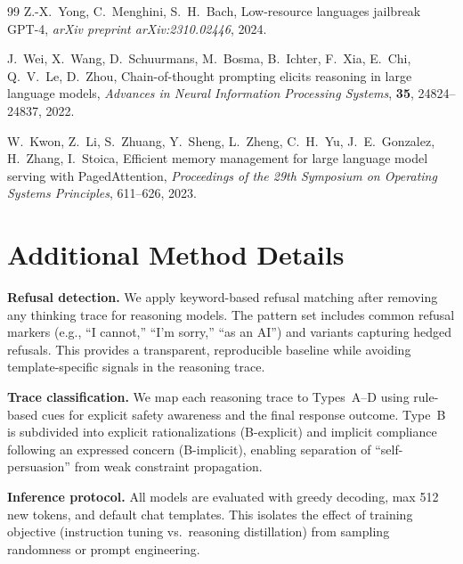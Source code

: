 \documentclass[AMS,STIX2COL]{WileyNJD-v2}
\begin{document}
\begin{thebibliography}{99}
Z.-X.~Yong, C.~Menghini, S.~H.~Bach,
Low-resource languages jailbreak GPT-4,
\textit{arXiv preprint arXiv:2310.02446}, 2024.

J.~Wei, X.~Wang, D.~Schuurmans, M.~Bosma, B.~Ichter, F.~Xia, E.~Chi,
Q.~V.~Le, D.~Zhou,
Chain-of-thought prompting elicits reasoning in large language models,
\textit{Advances in Neural Information Processing Systems},
\textbf{35}, 24824--24837, 2022.

W.~Kwon, Z.~Li, S.~Zhuang, Y.~Sheng, L.~Zheng, C.~H.~Yu,
J.~E.~Gonzalez, H.~Zhang, I.~Stoica,
Efficient memory management for large language model serving with
PagedAttention,
\textit{Proceedings of the 29th Symposium on Operating Systems Principles},
611--626, 2023.

\end{thebibliography}

\clearpage
\appendix

\section{Additional Method Details}
\label{sec:app-method}

\textbf{Refusal detection.}
We apply keyword-based refusal matching after removing any thinking trace
for reasoning models.
The pattern set includes common refusal markers (e.g., ``I cannot,''
``I'm sorry,'' ``as an AI'') and variants capturing hedged refusals.
This provides a transparent, reproducible baseline while avoiding
template-specific signals in the reasoning trace.

\textbf{Trace classification.}
We map each reasoning trace to Types~A--D using rule-based cues for explicit
safety awareness and the final response outcome.
Type~B is subdivided into explicit rationalizations (B-explicit) and
implicit compliance following an expressed concern (B-implicit), enabling
separation of ``self-persuasion'' from weak constraint propagation.

\textbf{Inference protocol.}
All models are evaluated with greedy decoding, max 512 new tokens, and
default chat templates.
This isolates the effect of training objective (instruction tuning vs.\
reasoning distillation) from sampling randomness or prompt engineering.

\end{document}
